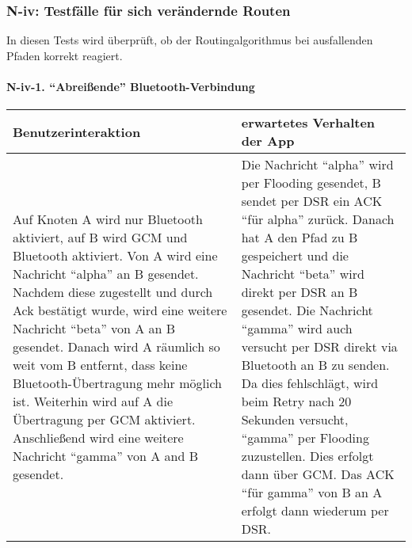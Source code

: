 

\clearpage



\subsubsection{N-iv: Testfälle für sich verändernde
Routen}\label{iv-testfuxe4lle-fuxfcr-sich-veruxe4ndernde-routen}

In diesen Tests wird überprüft, ob der Routingalgorithmus bei
ausfallenden Pfaden korrekt reagiert.

\paragraph{\texorpdfstring{N-iv-1. ``Abreißende''
Bluetooth-Verbindung}{N-iv-1. Abreißende Bluetooth-Verbindung}}\label{abreiuxdfende-bluetooth-verbindung}

\begin{longtable}{p{8cm}p{8.5cm}}
\toprule
Benutzerinteraktion & erwartetes Verhalten der App\tabularnewline
\midrule
\endhead
Auf Knoten A wird nur Bluetooth aktiviert, auf B wird GCM und
Bluetooth aktiviert. Von A wird eine Nachricht ``alpha'' an B gesendet.
Nachdem diese zugestellt und durch Ack bestätigt wurde, wird eine weitere
Nachricht ``beta'' von A an B gesendet. Danach wird A räumlich so weit
vom B entfernt, dass keine Bluetooth-Übertragung mehr möglich ist.
Weiterhin wird auf A die Übertragung per GCM aktiviert. Anschließend
wird eine weitere Nachricht ``gamma'' von A and B gesendet. & Die
Nachricht ``alpha'' wird per Flooding gesendet, B sendet per DSR ein ACK
``für alpha'' zurück. Danach hat A den Pfad zu B gespeichert und die
Nachricht ``beta'' wird direkt per DSR an B gesendet. Die Nachricht
``gamma'' wird auch versucht per DSR direkt via Bluetooth an B zu
senden. Da dies fehlschlägt, wird beim Retry nach 20 Sekunden versucht,
``gamma'' per Flooding zuzustellen. Dies erfolgt dann über GCM. Das ACK
``für gamma'' von B an A erfolgt dann wiederum per DSR.\tabularnewline
\bottomrule
\end{longtable}
\clearpage



